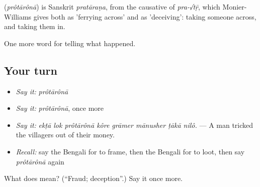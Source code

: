 \begin{cousinweb}
\textbf{} (\emph{prôtārônā}) is Sanskrit \emph{pratāraṇa}, from the causative of \emph{pra-√tṝ}, which Monier-Williams gives both as 'ferrying across' and as 'deceiving': taking someone across, and taking them in.
\end{cousinweb}

\begin{grammarlens}[title={What you've built}]
One more word for telling what happened.
\end{grammarlens}

\subsection*{Your turn}
\begin{itemize}
\raggedright
  \item \emph{Say it:} \emph{prôtārônā}
  \item \emph{Say it:} \emph{prôtārônā}, once more
  \item \emph{Say it:} \emph{ekṭā lok prôtārônā kôre grāmer mānusher ṭākā nilô.} — A man tricked the villagers out of their money.
  \item \emph{Recall:} say the Bengali for to frame, then the Bengali for to loot, then say \emph{prôtārônā} again
\end{itemize}

\begin{tcolorbox}[breakable,colback=teal!4,colframe=teal!35!black,title={Before you move on}]
What does  mean? (\textquotedblleft{}Fraud; deception\textquotedblright{}.) Say it once more.
\end{tcolorbox}
